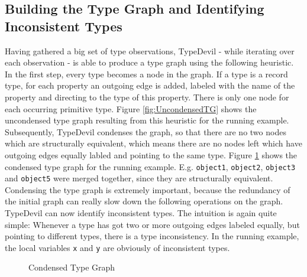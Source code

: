 \documentclass[runningheads,a4paper]{llncs}
\begin{document}
\subsection{Building the Type Graph and Identifying Inconsistent Types}
\label{TGs}
Having gathered a big set of type observations, TypeDevil - while iterating over each observation - is able to produce a type graph using the following heuristic.
In the first step, every type becomes a node in the graph.
If a type is a record type, for each property an outgoing edge is added, labeled with the name of the property and directing to the type of this property. 
There is only one node for each occurring primitive type.
Figure \ref{fig:UncondensedTG} shows the uncondensed type graph resulting from this heuristic for the running example.\\
Subsequently, TypeDevil condenses the graph, so that there are no two nodes which are structurally equivalent, which means there are no nodes left which have outgoing edges equally labled and pointing to the same type.
Figure \ref{fig:CondensedTG} shows the condensed type graph for the running example.
E.g. \lstinline[columns=fixed]{object1}, \lstinline[columns=fixed]{object2}, \lstinline[columns=fixed]{object3} and \lstinline[columns=fixed]{object5} were merged together, since they are structurally equivalent.
Condensing the type graph is extremely important, because the redundancy of the initial graph can really slow down the following operations on the graph.
TypeDevil can now identify inconsistent types. 
The intuition is again quite simple: 
Whenever a type has got two or more outgoing edges labeled equally, but pointing to different types, there is a type inconsistency.
In the running example, the local variables \lstinline[columns=fixed]{x} and \lstinline[columns=fixed]{y} are obviously of inconsistent types.
\begin{figure}[h]
    \caption{Condensed Type Graph}
    \label{fig:CondensedTG}
\end{figure}
\end{document}
